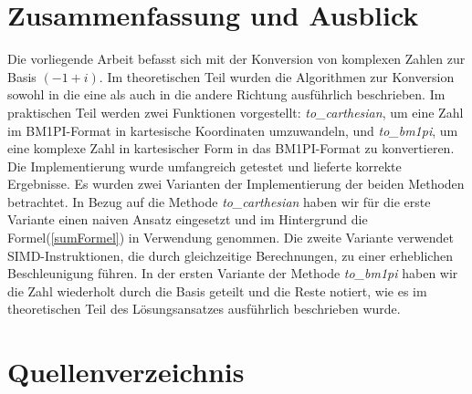 \documentclass[course=erap]{aspdoc}
\begin{document}
\begin{center}
\end{center}

\section{Zusammenfassung und Ausblick}
Die vorliegende Arbeit befasst sich mit der Konversion von komplexen Zahlen zur Basis $(-1 + i)$. Im theoretischen Teil wurden die Algorithmen zur Konversion sowohl in die eine als auch in die andere Richtung ausführlich beschrieben. \newline
Im praktischen Teil werden zwei Funktionen vorgestellt: \textit{to\_carthesian}, um eine Zahl im BM1PI-Format in kartesische Koordinaten umzuwandeln, und \textit{to\_bm1pi}, um eine komplexe Zahl in kartesischer Form in das BM1PI-Format zu konvertieren.
Die Implementierung wurde umfangreich getestet und lieferte korrekte Ergebnisse. Es wurden zwei Varianten der Implementierung der beiden Methoden betrachtet.
In Bezug auf die Methode \textit{to\_carthesian} haben wir für die erste Variante einen naiven Ansatz eingesetzt und im Hintergrund die Formel(\ref{sumFormel}) in Verwendung genommen. Die zweite Variante verwendet SIMD-Instruktionen, die durch gleichzeitige Berechnungen, zu einer erheblichen Beschleunigung führen. \newline
In der ersten Variante der Methode \textit{to\_bm1pi} haben wir die Zahl wiederholt durch die Basis geteilt und die Reste notiert, wie es im theoretischen Teil des Lösungsansatzes ausführlich beschrieben wurde.



\section{Quellenverzeichnis}




\end{document}
